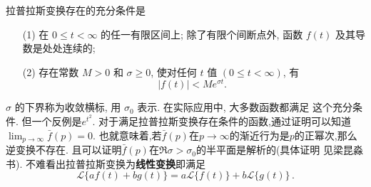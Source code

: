 拉普拉斯变换存在的充分条件是 
\begin{enumerate}
    \item[(1)]  在 $0 \leqslant t<\infty$ 的任一有限区间上; 除了有限个间断点外, 函数 $f(t)$ 及其导数是处处连续的;
    \item[(2)]  存在常数 $M>0$ 和 $\sigma \geqslant 0$, 使对任何 $t$ 值 $(0 \leqslant t<\infty)$, 有
    $$
    |f(t)|<M e^{\sigma t} \text {. }
    $$
\end{enumerate}
$\sigma$ 的下界称为收敛横标, 用 $\sigma_0$ 表示. 在实际应用中, 大多数函数都满足 这个充分条件.
但一个反例是$e^{t^2}$. 对于满足拉普拉斯变换存在条件的函数,通过证明可以知道$\lim_{p\to \infty} \bar{f}(p) = 0$.
也就意味着,若$\bar{f}(p)$在$p\to \infty$的渐近行为是$p$的正幂次,那么逆变换不存在. 且可以证明$\bar{f}(p)$在$\Re \sigma > \sigma_0$的半平面是解析的(具体证明
见梁昆淼书).
不难看出拉普拉斯变换为\textbf{线性变换}即满足
$$
\mathcal{L}\{a f(t)+b g(t)\}=a \mathcal{L}\{f(t)\}+b \mathcal{L}\{g(t)\} \,.
$$

